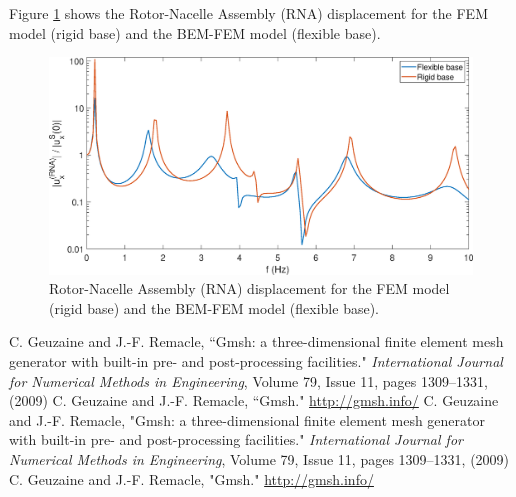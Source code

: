 \documentclass[a4]{article}
\begin{document}
Figure \ref{fig:results} shows the Rotor-Nacelle Assembly (RNA) displacement for the FEM model (rigid base) and the BEM-FEM model (flexible base).

\begin{figure}[tbh!]
	\centering
	\includegraphics[scale=0.5]{wind_turbine.eps}
	\caption{Rotor-Nacelle Assembly (RNA) displacement for the FEM model (rigid base) and the BEM-FEM model (flexible base).}
	\label{fig:results}
\end{figure}

\FloatBarrier

\begin{thebibliography}{99}
 C. Geuzaine and J.-F. Remacle, ``Gmsh: a three-dimensional finite element mesh generator with built-in pre- and post-processing facilities." \emph{International Journal for Numerical Methods in Engineering}, Volume 79, Issue 11, pages 1309--1331, (2009)
 C. Geuzaine and J.-F. Remacle, ``Gmsh." \url{http://gmsh.info/}
 C. Geuzaine and J.-F. Remacle, "Gmsh: a three-dimensional finite element mesh generator with built-in pre- and post-processing facilities." \emph{International Journal for Numerical Methods in Engineering}, Volume 79, Issue 11, pages 1309--1331, (2009)
 C. Geuzaine and J.-F. Remacle, "Gmsh." \url{http://gmsh.info/}
\end{thebibliography}
\end{document}
